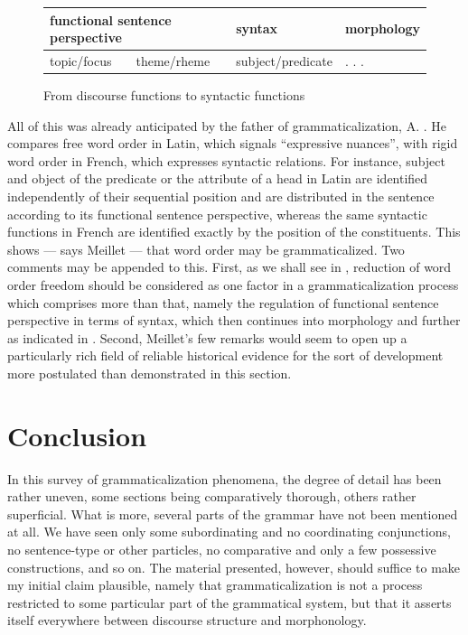 \begin{figure}
\begin{tabular}{llll}

\multicolumn{2}{l}{functional sentence perspective} & syntax & morphology\\
\midrule
{topic/focus} & theme/rheme & subject/predicate & . . .\\

\end{tabular}
\caption{From discourse functions to syntactic functions}\label{F9}
\end{figure}


\noindent All of this was already anticipated by the father of grammaticalization, A. \citet[147f]{Meillet1912}. He compares free word order in Latin, which signals “expressive nuances”, with rigid word order in French, which expresses syntactic relations. For instance, subject and object of the predicate or the attribute of a head in Latin are identified independently of their sequential position and are distributed in the sentence according to its functional sentence perspective, whereas the same syntactic functions in French are identified exactly by the position of the constituents. This shows — says Meillet — that word order may be grammaticalized. Two comments may be appended to this. First, as we shall see in , reduction of word order freedom should be considered as one factor in a grammaticalization process which comprises more than that, namely the regulation of functional sentence perspective in terms of syntax, which then continues into morphology and further as indicated in . Second, Meillet's few remarks would seem to open up a particularly rich field of reliable historical evidence for the sort of development more postulated than demonstrated in this section.

\section{Conclusion}

In this survey of grammaticalization phenomena, the degree of detail has been rather uneven, some sections being comparatively thorough, others rather superficial. What is more, several parts of the grammar have not been mentioned at all. We have seen only some subordinating and no coordinating conjunctions, no sentence-type or other particles, no comparative and only a few possessive constructions, and so on. The material presented, however, should suffice to make my initial claim plausible, namely that grammaticalization is not a process restricted to some particular part of the grammatical system, but that it asserts itself everywhere between discourse structure and morphonology.

